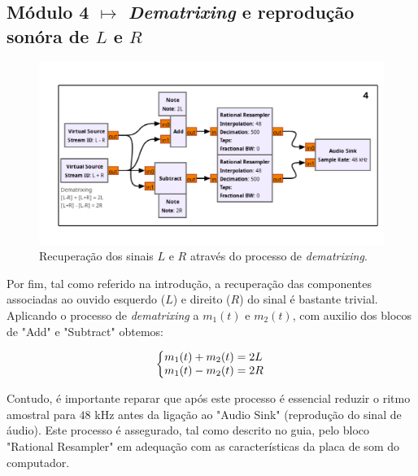 \subsection{Módulo 4 $\pmb \mapsto$ \textit{Dematrixing} e reprodução sonóra de $L$ e $R$}
\label{subsec:mod4}

\begin{figure}[H]
    \centering
    \includegraphics[width = 0.6\linewidth]{img/mods/modulo4.png}
    \caption{Recuperação dos sinais $L$ e $R$ através do processo de \textit{dematrixing}.}
    \label{fig:modulo4}
\end{figure}

Por fim, tal como referido na introdução, a recuperação das componentes associadas ao ouvido esquerdo ($L$) e direito ($R$) do sinal é bastante trivial. Aplicando o processo de \textit{dematrixing} a $m_1(t)$ e $m_2(t)$, com auxilio dos blocos de "Add" e "Subtract" obtemos:

\begin{equation*}
  \left\{\begin{array}{@{}l@{}}
    m_1(t)+m_2(t)=2L\\
    m_1(t)-m_2(t)=2R
  \end{array}\right.\,
\end{equation*}

Contudo, é importante reparar que após este processo é essencial reduzir o ritmo amostral para $48$ kHz antes da ligação ao "Audio Sink" (reprodução do sinal de áudio). Este processo é assegurado, tal como descrito no guia, pelo bloco "Rational Resampler" em adequação com as características da placa de som do computador.